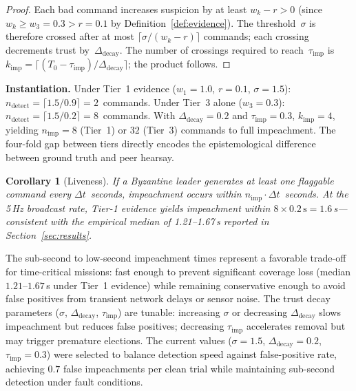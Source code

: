 \documentclass[conference]{IEEEtran}
\newtheorem{corollary}{Corollary}
\begin{document}
\begin{proof}
Each bad command increases suspicion by at least $w_k - r > 0$ (since $w_k \geq w_3 = 0.3 > r = 0.1$ by Definition~\ref{def:evidence}). The threshold~$\sigma$ is therefore crossed after at most $\lceil\sigma/(w_k - r)\rceil$ commands; each crossing decrements trust by~$\Delta_{\text{decay}}$. The number of crossings required to reach~$\tau_{\text{imp}}$ is $k_{\text{imp}} = \lceil(T_0 - \tau_{\text{imp}})/\Delta_{\text{decay}}\rceil$; the product follows.
\end{proof}

\noindent\textbf{Instantiation.}\;
Under Tier~1 evidence ($w_1{=}1.0$, $r{=}0.1$, $\sigma{=}1.5$): $n_{\text{detect}} = \lceil 1.5/0.9 \rceil = 2$~commands. Under Tier~3 alone ($w_3{=}0.3$): $n_{\text{detect}} = \lceil 1.5/0.2 \rceil = 8$~commands. With $\Delta_{\text{decay}}{=}0.2$ and $\tau_{\text{imp}}{=}0.3$, $k_{\text{imp}} = 4$, yielding $n_{\text{imp}} = 8$ (Tier~1) or $32$ (Tier~3) commands to full impeachment. The four-fold gap between tiers directly encodes the epistemological difference between ground truth and peer hearsay.

\begin{corollary}[Liveness]
\label{cor:liveness}
If a Byzantine leader generates at least one flaggable command every $\Delta t$~seconds, impeachment occurs within $n_{\text{imp}} \cdot \Delta t$~seconds. At the 5\,Hz broadcast rate, Tier-1 evidence yields impeachment within $8 \times 0.2\,\text{s} = 1.6\,$s---consistent with the empirical median of 1.21--1.67\,s reported in Section~\ref{sec:results}.
\end{corollary}

The sub-second to low-second impeachment times represent a favorable trade-off for time-critical missions: fast enough to prevent significant coverage loss (median $1.21$--$1.67$\,s under Tier~1 evidence) while remaining conservative enough to avoid false positives from transient network delays or sensor noise. The trust decay parameters ($\sigma$, $\Delta_{\text{decay}}$, $\tau_{\text{imp}}$) are tunable: increasing $\sigma$ or decreasing $\Delta_{\text{decay}}$ slows impeachment but reduces false positives; decreasing $\tau_{\text{imp}}$ accelerates removal but may trigger premature elections. The current values ($\sigma{=}1.5$, $\Delta_{\text{decay}}{=}0.2$, $\tau_{\text{imp}}{=}0.3$) were selected to balance detection speed against false-positive rate, achieving $0.7$ false impeachments per clean trial while maintaining sub-second detection under fault conditions.
\end{document}
